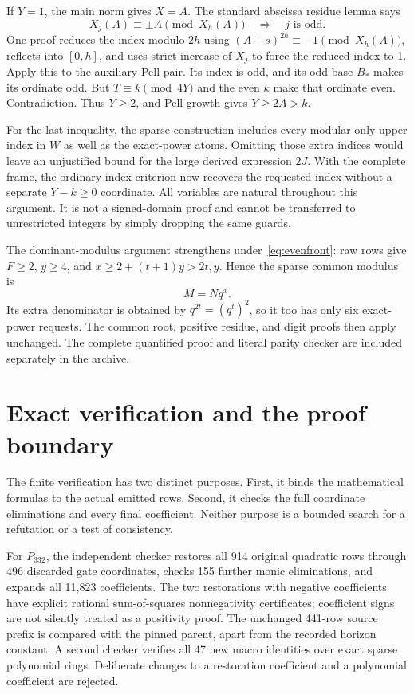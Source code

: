 \documentclass[11pt,letterpaper]{article}
\theoremstyle{remark}\newtheorem{remark}[theorem]{Remark}
\newcommand{\Psmall}{P_{332}}\newcommand{\Psparse}{P_{333}}
\begin{document}
If \(Y=1\), the main norm gives \(X=A\). The standard abscissa
residue lemma says
\[
 X_j(A)\equiv\pm A\pmod{X_h(A)}\quad\Longrightarrow\quad j
 \text{ is odd}.
\]
One proof reduces the index modulo \(2h\) using
\((A+s)^{2h}\equiv-1\pmod{X_h(A)}\), reflects into \([0,h]\),
and uses strict increase of \(X_j\) to force the reduced index to 1.
Apply this to the auxiliary Pell pair. Its index is odd, and its odd
base \(B_*\) makes its ordinate odd. But
\(T\equiv k\pmod{4Y}\) and the even \(k\) make that ordinate even.
Contradiction. Thus \(Y\ge2\), and Pell growth gives
\(Y\ge2A>k\).

For the last inequality, the sparse construction includes every
modular-only upper index in \(W\) as well as the exact-power atoms.
Omitting those extra indices would leave an unjustified bound for the
large derived expression \(2J\). With the complete frame, the ordinary
index criterion now recovers the requested index without a separate
\(Y-k\ge0\) coordinate. All variables are natural throughout this
argument. It is not a signed-domain proof and cannot be transferred to
unrestricted integers by simply dropping the same guards.

The dominant-modulus argument strengthens under~\eqref{eq:evenfront}:
raw rows give \(F\ge2\), \(y\ge4\), and
\(x\ge2+(t+1)y>2t,y\). Hence the sparse common modulus is
\[
 M=Nq^x.
\]
Its extra denominator is obtained by \(q^{2t}=(q^t)^2\), so it too
has only six exact-power requests. The common root, positive residue,
and digit proofs then apply unchanged. The complete quantified proof
and literal parity checker are included separately in the archive.

\section{Exact verification and the proof boundary}

The finite verification has two distinct purposes. First, it binds the
mathematical formulas to the actual emitted rows. Second, it checks the
full coordinate eliminations and every final coefficient. Neither purpose
is a bounded search for a refutation or a test of consistency.

For \(\Psmall\), the independent checker restores all 914 original
quadratic rows through 496 discarded gate coordinates, checks 155 further
monic eliminations, and expands all 11,823 coefficients. The two
restorations with negative coefficients have explicit rational
sum-of-squares nonnegativity certificates; coefficient signs are not
silently treated as a positivity proof. The unchanged 441-row source
prefix is compared with the pinned parent, apart from the recorded
horizon constant. A second checker verifies all 47 new macro identities
over exact sparse polynomial rings. Deliberate changes to a restoration
coefficient and a polynomial coefficient are rejected.
\end{document}
